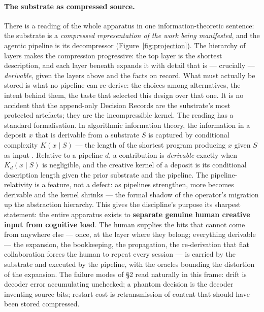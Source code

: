 \documentclass[11pt,a4paper,twocolumn]{article}
\begin{document}
\paragraph{The substrate as compressed source.} There is a
reading of the whole apparatus in one information-theoretic
sentence: the substrate is a \emph{compressed representation of
the work being manifested}, and the agentic pipeline is its
decompressor (Figure~\ref{fig:projection}). The hierarchy of
layers makes the compression progressive: the top layer is the
shortest description, and each layer beneath expands it with
detail that is --- crucially --- \emph{derivable}, given the
layers above and the facts on record. What must actually be
stored is what no pipeline can re-derive: the choices among
alternatives, the intent behind them, the taste that selected
this design over that one. It is no accident that the append-only
Decision Records are the substrate's most protected artefacts;
they are the incompressible kernel. The reading has a standard
formalisation. In algorithmic information theory, the information
in a deposit $x$ that is derivable from a substrate $S$ is
captured by conditional complexity $K(x \mid S)$ --- the length
of the shortest program producing $x$ given $S$ as input
\citep{kolmogorov1965, li2008kolmogorov}. Relative to a pipeline
$d$, a contribution is \emph{derivable} exactly when
$K_d(x \mid S)$ is negligible, and the creative kernel of a
deposit is its conditional description length given the prior
substrate and the pipeline. The pipeline-relativity is a feature,
not a defect: as pipelines strengthen, more becomes derivable and
the kernel shrinks --- the formal shadow of the operator's
migration up the abstraction hierarchy. This gives the discipline's
purpose its sharpest statement: the entire apparatus exists to
\textbf{separate genuine human creative input from cognitive
load}. The human supplies the bits that cannot come from anywhere
else --- once, at the layer where they belong; everything
derivable --- the expansion, the bookkeeping, the propagation,
the re-derivation that flat collaboration forces the human to
repeat every session --- is carried by the substrate and executed
by the pipeline, with the oracles bounding the distortion of the
expansion. The failure modes of \S2 read naturally in this frame:
drift is decoder error accumulating unchecked; a phantom decision
is the decoder inventing source bits; restart cost is
retransmission of content that should have been stored
compressed.
\end{document}
